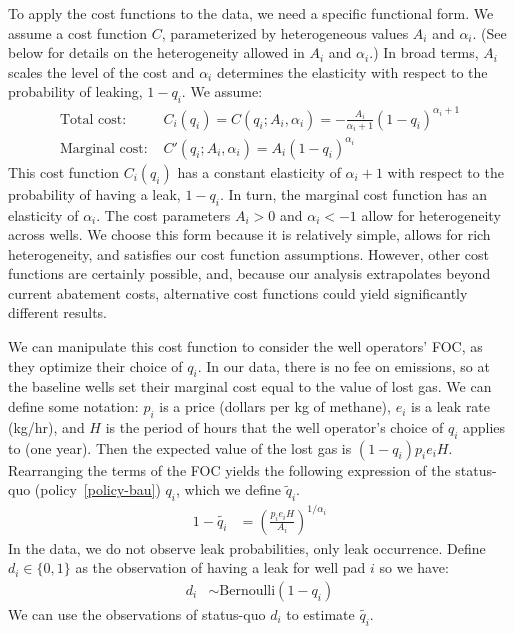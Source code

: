 To apply the cost functions to the data, we need a specific functional form.
We assume a cost function \(C\), parameterized by heterogeneous  values \(A_i\) and \(\alpha_i\).
(See below for details on the heterogeneity allowed in \(A_i\) and \(\alpha_i\).)
In broad terms, \(A_i\) scales the level of the cost and \(\alpha_i\) determines the elasticity with respect to the probability of leaking, \(1 - q_i\).
We assume:
\begin{align*}
\text{Total cost: }& C_i(q_i) = C(q_i; A_i, \alpha_i) = -\frac{A_i}{\alpha_i + 1} (1 - q_i) ^{\alpha_i + 1}\\
\text{Marginal cost: }& C'(q_i; A_i,\alpha_i) = A_i (1 - q_i) ^{\alpha_i}
\end{align*}
This cost function \(C_i(q_i)\) has a constant elasticity of \(\alpha_i + 1\) with respect to the probability of having a leak, \(1 - q_i\).
In turn, the marginal cost function has an elasticity of \(\alpha_i\).
The cost parameters \(A_i > 0\) and \(\alpha_i < -1\) allow for heterogeneity across wells.
We choose this form because it is relatively simple, allows for rich heterogeneity, and satisfies our cost function assumptions.
However, other cost functions are certainly possible, and, because our analysis extrapolates beyond current abatement costs, alternative cost functions could yield significantly different results.

We can manipulate this cost function to consider the well operators' \gls{FOC}, as they optimize their choice of \(q_i\).
In our data, there is no fee on emissions, so at the baseline wells set their marginal cost equal to the value of lost gas.
We can define some notation:
\(p_i\) is a price (dollars per kg of methane),
\(e_i\) is a leak rate (kg/hr), and
\(H\) is the period of hours that the well operator's choice of \(q_i\) applies to (one year).
Then the expected value of the lost gas is \((1 - q_i) p_i e_i H\).
Rearranging the terms of the \gls{FOC} yields the following expression of the status-quo (policy~\ref{policy-bau}) \(q_i\), which we define \(\tilde{q}_i\).
\begin{align}
\label{eqn:q_tilde}
    1 - \tilde{q_i} &= \left(\frac{p_i e_i H}{A_i}\right) ^{1 / \alpha_i}
\end{align}
In the data, we do not observe leak probabilities, only leak occurrence.
Define \(d_i \in \{0, 1\}\) as the observation of having a leak for well pad \(i\) so we have:
\begin{align*}
    d_i &\sim \text{Bernoulli}(1 - q_i)
\end{align*}
We can use the observations of status-quo \(d_i\) to estimate \(\tilde{q_i}\).

